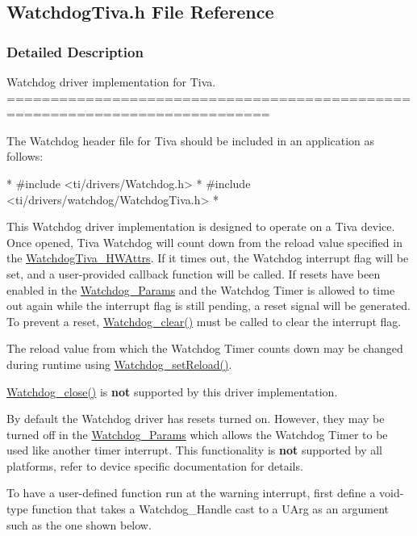 \subsection{Watchdog\-Tiva.\-h File Reference}
\label{_watchdog_tiva_8h}


\subsubsection{Detailed Description}
Watchdog driver implementation for Tiva. ============================================================================

The Watchdog header file for Tiva should be included in an application as follows\-: 
\begin{DoxyCode}
*  #include <ti/drivers/Watchdog.h>
*  #include <ti/drivers/watchdog/WatchdogTiva.h>
*  
\end{DoxyCode}


This Watchdog driver implementation is designed to operate on a Tiva device. Once opened, Tiva Watchdog will count down from the reload value specified in the \hyperlink{struct_watchdog_tiva___h_w_attrs}{Watchdog\-Tiva\-\_\-\-H\-W\-Attrs}. If it times out, the Watchdog interrupt flag will be set, and a user-\/provided callback function will be called. If resets have been enabled in the \hyperlink{struct_watchdog___params}{Watchdog\-\_\-\-Params} and the Watchdog Timer is allowed to time out again while the interrupt flag is still pending, a reset signal will be generated. To prevent a reset, \hyperlink{_watchdog_8h_a396decd6b1807db10c636f9987c3be4c}{Watchdog\-\_\-clear()} must be called to clear the interrupt flag.

The reload value from which the Watchdog Timer counts down may be changed during runtime using \hyperlink{_watchdog_8h_a77ec81e1304fe05b77a9976e10e2d9a3}{Watchdog\-\_\-set\-Reload()}.

\hyperlink{_watchdog_8h_a1c0dfea7011b06f303d01afb631ffbdd}{Watchdog\-\_\-close()} is {\bfseries not} supported by this driver implementation.

By default the Watchdog driver has resets turned on. However, they may be turned off in the \hyperlink{struct_watchdog___params}{Watchdog\-\_\-\-Params} which allows the Watchdog Timer to be used like another timer interrupt. This functionality is {\bfseries not} supported by all platforms, refer to device specific documentation for details.

To have a user-\/defined function run at the warning interrupt, first define a void-\/type function that takes a Watchdog\-\_\-\-Handle cast to a U\-Arg as an argument such as the one shown below.


